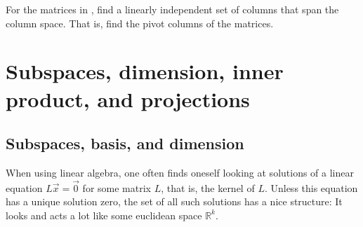 \begin{exercise}
For the matrices in , find
a linearly independent set of columns that span the column space.
That is, find the pivot columns of the matrices.
\end{exercise}




\sectionnewpage
\section{Subspaces, dimension, inner product, and projections}
\label{subspaces:section}


\subsection{Subspaces, basis, and dimension}

When using linear algebra, one often finds oneself looking at
solutions of a linear equation $L\vec{x} = \vec{0}$ for some matrix $L$,
that is, the kernel of $L$.
Unless this equation has a unique solution zero,
the set of all such solutions has a nice structure:  It looks and
acts a lot like some euclidean space ${\mathbb R}^k$.

